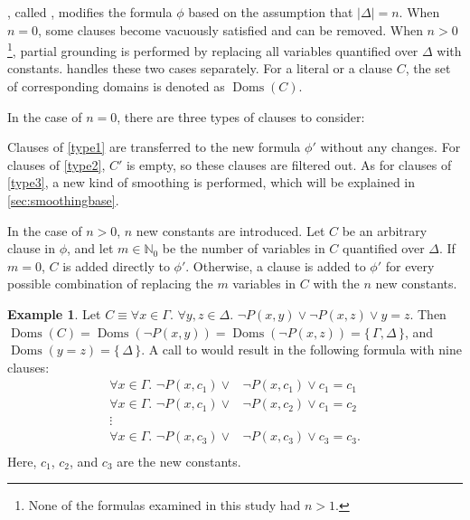 \documentclass[letterpaper]{article} %
\theoremstyle{remark}
\theoremstyle{definition}
\newtheorem{example}{Example}
\DeclareMathOperator{\Doms}{Doms}
\begin{document}
, called \Propagate, modifies the formula $\phi$ based on
the assumption that $|\Delta| = n$. When $n=0$, some clauses become vacuously
satisfied and can be removed. When $n > 0$\footnote{None of the formulas
  examined in this study had $n > 1$.}, partial grounding is performed by
replacing all variables quantified over $\Delta$ with constants.
 handles these two cases separately. For a literal or a
clause $C$, the set of corresponding domains is denoted as $\Doms(C)$.

In the case of $n = 0$, there are three types of clauses to consider:
Clauses of \cref{type1} are transferred to the new formula $\phi'$ without any
changes. For clauses of \cref{type2}, $C'$ is empty, so these clauses are
filtered out. As for clauses of \cref{type3}, a new kind of smoothing is
performed, which will be explained in \cref{sec:smoothingbase}.

In the case of $n>0$, $n$ new constants are introduced. Let $C$ be an arbitrary
clause in $\phi$, and let $m \in \mathbb{N}_{0}$ be the number of variables in
$C$ quantified over $\Delta$. If $m=0$, $C$ is added directly to $\phi'$.
Otherwise, a clause is added to $\phi'$ for every possible combination of
replacing the $m$ variables in $C$ with the $n$ new constants.

\begin{example}
  Let $C \equiv \forall x \in \Gamma\text{. }\forall y, z \in \Delta\text{.
  } \neg P(x, y) \lor \neg P(x, z) \lor y=z$. Then
  $\Doms(C) = \Doms(\neg P(x, y)) = \Doms(\neg P(x, z)) = \{\, \Gamma, \Delta \,\}$,
  and $\Doms(y=z) = \{\, \Delta \,\}$. A call to  would result in the following formula with nine clauses:
  \begin{align*}
    \forall x \in \Gamma\text{. }\neg P(x, c_{1}) \lor& \neg P(x, c_{1}) \lor c_{1}=c_{1}\\
    \forall x \in \Gamma\text{. }\neg P(x, c_{1}) \lor& \neg P(x, c_{2}) \lor c_{1}=c_{2}\\
    \vdots&\\
    \forall x \in \Gamma\text{. }\neg P(x, c_{3}) \lor& \neg P(x, c_{3}) \lor c_{3}=c_{3}.\\
  \end{align*}
  Here, $c_{1}$, $c_{2}$, and $c_{3}$ are the new constants.
\end{example}
\end{document}
